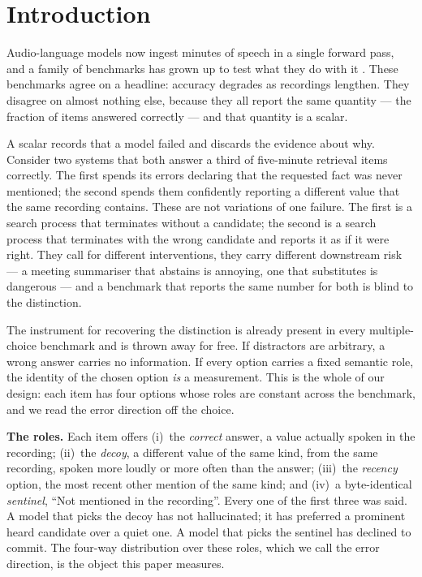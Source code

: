 \documentclass{article}
\begin{document}
\section{Introduction}
\label{sec:intro}

Audio-language models now ingest minutes of speech in a single forward pass,
and a family of benchmarks has grown up to test what they do with it
\cite{airbench,mmau,audiobench,dynamicsuperb}. These benchmarks agree on a
headline: accuracy degrades as recordings lengthen. They disagree on almost
nothing else, because they all report the same quantity --- the fraction of
items answered correctly --- and that quantity is a scalar.

A scalar records that a model failed and discards the evidence about why.
Consider two systems that both answer a third of five-minute retrieval items
correctly. The first spends its errors declaring that the requested fact was
never mentioned; the second spends them confidently reporting a different
value that the same recording contains. These are not variations of one
failure. The first is a search process that terminates without a candidate;
the second is a search process that terminates with the wrong candidate and
reports it as if it were right. They call for different interventions, they
carry different downstream risk --- a meeting summariser that abstains is
annoying, one that substitutes is dangerous --- and a benchmark that reports
the same number for both is blind to the distinction.

The instrument for recovering the distinction is already present in every
multiple-choice benchmark and is thrown away for free. If distractors are
arbitrary, a wrong answer carries no information. If every option carries a
fixed semantic role, the identity of the chosen option \emph{is} a
measurement. This is the whole of our design: each item has four options
whose roles are constant across the benchmark, and we read the error
direction off the choice.

\textbf{The roles.} Each item offers (i)~the \emph{correct} answer, a value
actually spoken in the recording; (ii)~the \emph{decoy}, a different value of
the same kind, from the same recording, spoken more loudly or more often than
the answer; (iii)~the \emph{recency} option, the most recent other mention of
the same kind; and (iv)~a byte-identical \emph{sentinel}, ``Not mentioned in
the recording''. Every one of the first three was said. A model that picks
the decoy has not hallucinated; it has preferred a prominent heard candidate
over a quiet one. A model that picks the sentinel has declined to commit. The
four-way distribution over these roles, which we call the error direction, is
the object this paper measures.
\end{document}
